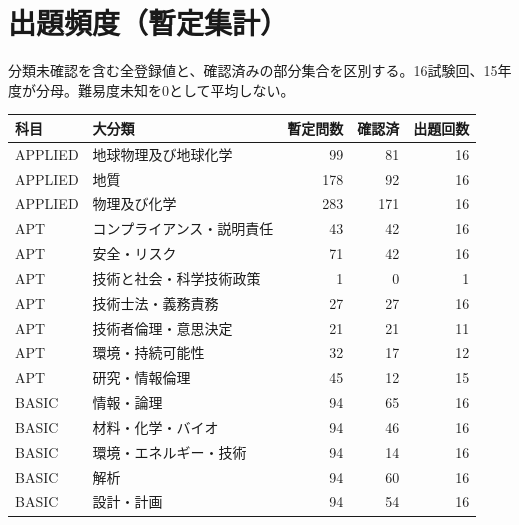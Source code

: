 \chapter{出題頻度（暫定集計）}
分類未確認を含む全登録値と、確認済みの部分集合を区別する。16試験回、15年度が分母。難易度未知を0として平均しない。
\begin{longtable}{p{.16\linewidth}p{.42\linewidth}rrr}
科目 & 大分類 & 暫定問数 & 確認済 & 出題回数\\\hline
APPLIED & 地球物理及び地球化学 & 99 & 81 & 16\\
APPLIED & 地質 & 178 & 92 & 16\\
APPLIED & 物理及び化学 & 283 & 171 & 16\\
APT & コンプライアンス・説明責任 & 43 & 42 & 16\\
APT & 安全・リスク & 71 & 42 & 16\\
APT & 技術と社会・科学技術政策 & 1 & 0 & 1\\
APT & 技術士法・義務責務 & 27 & 27 & 16\\
APT & 技術者倫理・意思決定 & 21 & 21 & 11\\
APT & 環境・持続可能性 & 32 & 17 & 12\\
APT & 研究・情報倫理 & 45 & 12 & 15\\
BASIC & 情報・論理 & 94 & 65 & 16\\
BASIC & 材料・化学・バイオ & 94 & 46 & 16\\
BASIC & 環境・エネルギー・技術 & 94 & 14 & 16\\
BASIC & 解析 & 94 & 60 & 16\\
BASIC & 設計・計画 & 94 & 54 & 16\\
\end{longtable}
